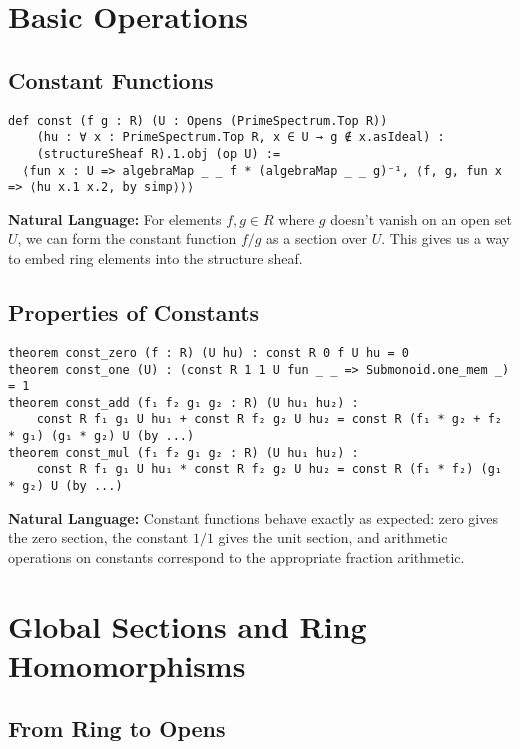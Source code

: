 \documentclass{article}
\theoremstyle{definition}
\begin{document}
\section{Basic Operations}

\subsection{Constant Functions}

\begin{lstlisting}
def const (f g : R) (U : Opens (PrimeSpectrum.Top R))
    (hu : ∀ x : PrimeSpectrum.Top R, x ∈ U → g ∉ x.asIdeal) :
    (structureSheaf R).1.obj (op U) :=
  ⟨fun x : U => algebraMap _ _ f * (algebraMap _ _ g)⁻¹, ⟨f, g, fun x => ⟨hu x.1 x.2, by simp⟩⟩⟩
\end{lstlisting}

\textbf{Natural Language:} For elements $f, g \in R$ where $g$ doesn't vanish on an open set $U$, we can form the constant function $f/g$ as a section over $U$. This gives us a way to embed ring elements into the structure sheaf.

\subsection{Properties of Constants}

\begin{lstlisting}
theorem const_zero (f : R) (U hu) : const R 0 f U hu = 0
theorem const_one (U) : (const R 1 1 U fun _ _ => Submonoid.one_mem _) = 1
theorem const_add (f₁ f₂ g₁ g₂ : R) (U hu₁ hu₂) :
    const R f₁ g₁ U hu₁ + const R f₂ g₂ U hu₂ = const R (f₁ * g₂ + f₂ * g₁) (g₁ * g₂) U (by ...)
theorem const_mul (f₁ f₂ g₁ g₂ : R) (U hu₁ hu₂) :
    const R f₁ g₁ U hu₁ * const R f₂ g₂ U hu₂ = const R (f₁ * f₂) (g₁ * g₂) U (by ...)
\end{lstlisting}

\textbf{Natural Language:} Constant functions behave exactly as expected: zero gives the zero section, the constant $1/1$ gives the unit section, and arithmetic operations on constants correspond to the appropriate fraction arithmetic.

\section{Global Sections and Ring Homomorphisms}

\subsection{From Ring to Opens}
\end{document}

